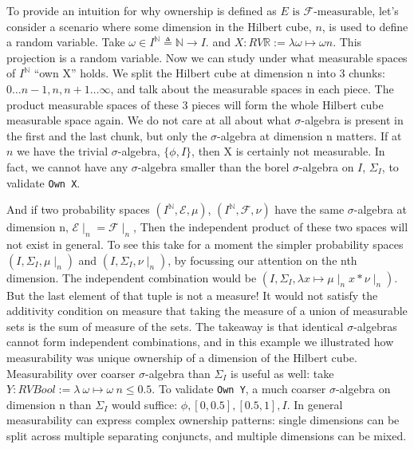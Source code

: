 To provide an intuition for why ownership is defined as \( E \text{ is } \mathcal{F}\text{-measurable} \), let's consider a scenario where some dimension in the Hilbert cube, $n$,
is used to define a random variable. Take $\omega \in I^\mathbb{N} \triangleq \mathbb{N} \to I$. and $X : RV \mathbb{R} := \lambda \omega \mapsto \omega n$. This projection is a random
variable. Now we can study under what measurable spaces of $I^\mathbb{N}$ ``own X'' holds. We split the Hilbert cube at dimension n into 3 chunks: $0 \ldots n-1, n, n+1 \ldots \infty$,
and talk about the measurable spaces in each piece. The product measurable spaces of these 3 pieces will form the whole Hilbert cube measurable space again.
We do not care at all about what $\sigma$-algebra is present in the first and the last chunk, but only the $\sigma$-algebra at dimension n matters. If at $n$ we have the trivial $\sigma$-algebra,
$\{\phi, I\}$, then X is certainly not measurable. In fact, we cannot have any $\sigma$-algebra smaller than the borel $\sigma$-algebra on $I$, $\Sigma_I$, to validate \texttt{Own X}.

And if two probability spaces $(I^\mathbb{N}, \mathcal{E}, \mu)$,  $(I^\mathbb{N}, \mathcal{F}, \nu)$ have the same $\sigma$-algebra at dimension n, $\mathcal{E}\!\mid_n = \mathcal{F}\!\mid_n$,
Then the independent product of these two spaces will not exist in general. To see this take for a moment the simpler probability spaces $(I, \Sigma_I, \mu\!\mid_n)$ and $(I, \Sigma_I, \nu\!\mid_n)$,
by focussing our attention on the nth dimension. The independent combination would be $(I, \Sigma_I, \lambda x \mapsto \mu\!\mid_n x * \nu\!\mid_n )$. But the last element of that tuple is not
a measure! It would not satisfy the additivity condition on measure that taking the measure of a union of measurable sets is the sum of measure of the sets.
The takeaway is that identical $\sigma$-algebras cannot form independent combinations, and in this example we illustrated how measurability was unique ownership of a dimension of the Hilbert cube.
Measurability over coarser $\sigma$-algebra than $\Sigma_I$ is useful as well: take $Y : RV Bool := \lambda\ \omega \mapsto \omega\ n \le 0.5$. To validate \texttt{Own Y}, a much coarser $\sigma$-algebra on dimension n
than $\Sigma_I$ would suffice: ${\phi, [0,0.5], [0.5,1], I}$. In general measurability can express complex ownership patterns: single dimensions can be split across multiple separating conjuncts, and multiple dimensions can be mixed.

